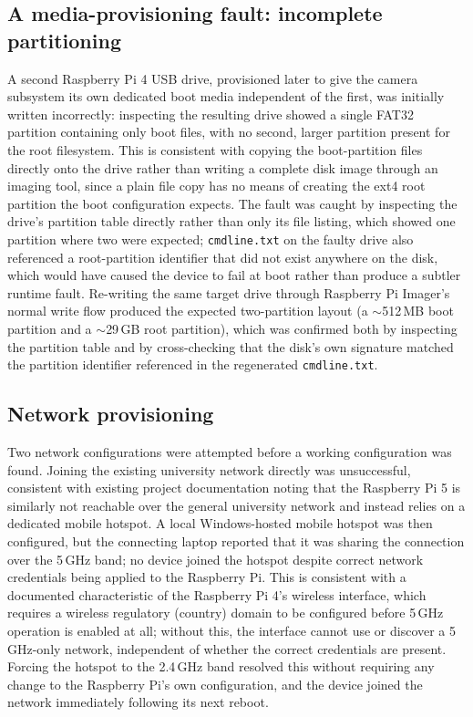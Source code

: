 \subsection{A media-provisioning fault: incomplete partitioning}

A second Raspberry Pi 4 USB drive, provisioned later to give the camera subsystem its own dedicated boot media independent of the first, was initially written incorrectly: inspecting the resulting drive showed a single FAT32 partition containing only boot files, with no second, larger partition present for the root filesystem. This is consistent with copying the boot-partition files directly onto the drive rather than writing a complete disk image through an imaging tool, since a plain file copy has no means of creating the ext4 root partition the boot configuration expects. The fault was caught by inspecting the drive's partition table directly rather than only its file listing, which showed one partition where two were expected; \texttt{cmdline.txt} on the faulty drive also referenced a root-partition identifier that did not exist anywhere on the disk, which would have caused the device to fail at boot rather than produce a subtler runtime fault. Re-writing the same target drive through Raspberry Pi Imager's normal write flow produced the expected two-partition layout (a $\sim$512\,MB boot partition and a $\sim$29\,GB root partition), which was confirmed both by inspecting the partition table and by cross-checking that the disk's own signature matched the partition identifier referenced in the regenerated \texttt{cmdline.txt}.

\subsection{Network provisioning}

Two network configurations were attempted before a working configuration was found. Joining the existing university network directly was unsuccessful, consistent with existing project documentation noting that the Raspberry Pi 5 is similarly not reachable over the general university network and instead relies on a dedicated mobile hotspot. A local Windows-hosted mobile hotspot was then configured, but the connecting laptop reported that it was sharing the connection over the 5\,GHz band; no device joined the hotspot despite correct network credentials being applied to the Raspberry Pi. This is consistent with a documented characteristic of the Raspberry Pi 4's wireless interface, which requires a wireless regulatory (country) domain to be configured before 5\,GHz operation is enabled at all; without this, the interface cannot use or discover a 5\,GHz-only network, independent of whether the correct credentials are present. Forcing the hotspot to the 2.4\,GHz band resolved this without requiring any change to the Raspberry Pi's own configuration, and the device joined the network immediately following its next reboot.

